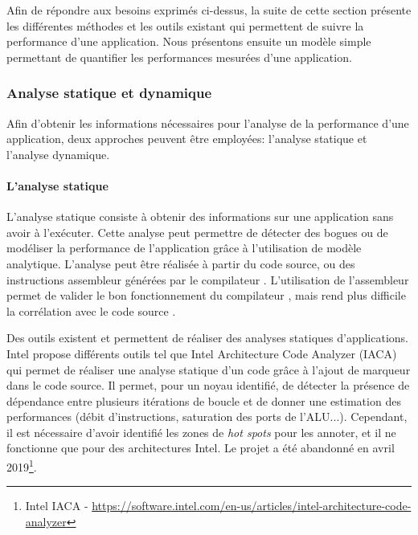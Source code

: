          Afin de répondre aux besoins exprimés ci-dessus, la suite de cette section présente les différentes méthodes et les outils existant qui permettent de suivre la performance d'une application. Nous présentons ensuite un modèle simple permettant de quantifier les performances mesurées d'une application.
           
      
 
    \subsubsection{Analyse statique et dynamique}
        
        Afin d'obtenir les informations nécessaires pour l'analyse de la performance d'une application, deux approches peuvent être employées: l'analyse statique et l'analyse dynamique.
        
        \paragraph{L'analyse statique}
            
            L’analyse statique consiste à obtenir des informations sur une application sans avoir à l'exécuter. Cette analyse peut permettre de détecter des bogues \cite{Lattner2016} ou de modéliser la performance de l'application grâce à l'utilisation de modèle analytique. L'analyse peut être réalisée à partir du code source, ou des instructions assembleur générées par le compilateur \cite{Djoudi2005, wong2015vp3}. L'utilisation de l'assembleur permet de valider le bon fonctionnement du compilateur \cite{charif2014cqa}, mais rend plus difficile la corrélation avec le code source \cite{de2010new}.
            
            Des outils existent et permettent de réaliser des analyses statiques d'applications. 
            Intel propose différents outils tel que Intel Architecture Code Analyzer (IACA) \cite{Hirsh2012} qui permet de réaliser une analyse statique d'un code grâce à l'ajout de marqueur dans le code source. Il permet, pour un noyau identifié, de détecter la présence de dépendance entre plusieurs itérations de boucle et de donner une estimation des performances (débit d'instructions, saturation des ports de l'ALU...). Cependant, il est nécessaire d'avoir identifié les zones de \textit{hot spots} pour les annoter, et il ne fonctionne que pour des architectures Intel. Le projet a été abandonné en avril 2019\footnote{Intel IACA - \url{https://software.intel.com/en-us/articles/intel-architecture-code-analyzer}}.
        
